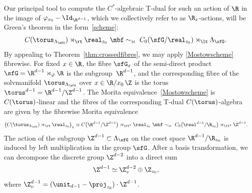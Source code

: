 Our principal tool to compute the $C^*$-algebraic
T-dual for such an action of $\R$ in the image of $\varphi_{x_0}-\Id_{\R^{d-1}}$, which we collectively refer to as
$\R_z$-actions, will be Green's theorem in the form~\eqref{scheme}:
\begin{gather}\label{Mostowscheme}
C(\torus_{\Lambda_\sfG})\rtimes_\rt \real_{ z_0} \ \mbf\sim_{\text{\tiny M}} \
C_0(\sfG/\real_{ z_0})\rtimes_\lt \Lambda_\sfG .
\end{gather}
By appealing to
Theorem~\ref{thm:crossedfibres}, we may apply \eqref{Mostowscheme}
fibrewise. For fixed $x\in\R$, the fibre $\sfG_x$ of the semi-direct
product $\sfG=\R^{d-1}\rtimes_{\hat\varphi}\R$ is the subgroup~$\R^{d-1}$, and the corresponding fibre of
the solvmanifold $\torus_{\Lambda_\sfG}$ over $x\in\R/x_0\,\Z$ is the
torus $\torus^{d-1}=\R^{d-1}/\Z^{d-1}$. The Morita
equivalence~\eqref{Mostowscheme} is $C(\torus)$-linear and the fibres of the corresponding
T-dual $C(\torus)$-algebra are given by the fibrewise Morita
equivalence
\begin{gather}\label{eq:Mostowschemefiber}
\big(C(\torus_{\Lambda_\sfG})\rtimes_\rt\real_{ z_0}\big)_x \simeq
C\big(\R^{d-1}/\Z^{d-1}\big)\rtimes_{\rt^x}\real_{ z_0} \
\mbf\sim_{\text{\tiny M}} \
C_0\big(\real^{d-1}/\R_{ z_0}\big)\rtimes_{\lt^x}\Z^{d-1} .
\end{gather}
The action of the subgroup $\Z^{d-1}\subset\Lambda_\sfG$ on the
coset space $\R^{d-1}/\R_{ z_0}$ is induced by left multiplication in the
group $\sfG$.
After a basis transformation, we can decompose the discrete group $\Z^{d-2}$ into a direct sum
\[
\Z^{d-1} \simeq \Z_v^{d-2}\oplus\Z_{ z_0} ,
\]
where $\Z_v^{d-1} = (\unit_{d-1}-\proj_{z_0})\cdot\Z^{d-1}$.

